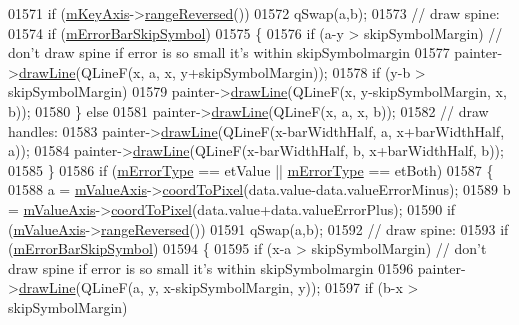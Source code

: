 \begin{DoxyCode}
01571       \textcolor{keywordflow}{if} (\hyperlink{a00024_a692421b963472fa6e16156a74ba96832}{mKeyAxis}->\hyperlink{a00025_ade26dc7994ccd8a11f64fd83377ee021}{rangeReversed}())
01572         qSwap(a,b);
01573       \textcolor{comment}{// draw spine:}
01574       \textcolor{keywordflow}{if} (\hyperlink{a00031_acf631d7dbd1055a69ab3b63094868557}{mErrorBarSkipSymbol})
01575       \{
01576         \textcolor{keywordflow}{if} (a-y > skipSymbolMargin) \textcolor{comment}{// don't draw spine if error is so small it's within skipSymbolmargin}
01577           painter->\hyperlink{a00047_a0b4b1b9bd495e182c731774dc800e6e0}{drawLine}(QLineF(x, a, x, y+skipSymbolMargin));
01578         \textcolor{keywordflow}{if} (y-b > skipSymbolMargin) 
01579           painter->\hyperlink{a00047_a0b4b1b9bd495e182c731774dc800e6e0}{drawLine}(QLineF(x, y-skipSymbolMargin, x, b));
01580       \} \textcolor{keywordflow}{else}
01581         painter->\hyperlink{a00047_a0b4b1b9bd495e182c731774dc800e6e0}{drawLine}(QLineF(x, a, x, b));
01582       \textcolor{comment}{// draw handles:}
01583       painter->\hyperlink{a00047_a0b4b1b9bd495e182c731774dc800e6e0}{drawLine}(QLineF(x-barWidthHalf, a, x+barWidthHalf, a));
01584       painter->\hyperlink{a00047_a0b4b1b9bd495e182c731774dc800e6e0}{drawLine}(QLineF(x-barWidthHalf, b, x+barWidthHalf, b));
01585     \}
01586     \textcolor{keywordflow}{if} (\hyperlink{a00031_a29e64273db201aeadebc61c870720a36}{mErrorType} == etValue || \hyperlink{a00031_a29e64273db201aeadebc61c870720a36}{mErrorType} == etBoth)
01587     \{
01588       a = \hyperlink{a00024_acfc46d619ab9598be33b64146da45822}{mValueAxis}->\hyperlink{a00025_a985ae693b842fb0422b4390fe36d299a}{coordToPixel}(data.value-data.valueErrorMinus);
01589       b = \hyperlink{a00024_acfc46d619ab9598be33b64146da45822}{mValueAxis}->\hyperlink{a00025_a985ae693b842fb0422b4390fe36d299a}{coordToPixel}(data.value+data.valueErrorPlus);
01590       \textcolor{keywordflow}{if} (\hyperlink{a00024_acfc46d619ab9598be33b64146da45822}{mValueAxis}->\hyperlink{a00025_ade26dc7994ccd8a11f64fd83377ee021}{rangeReversed}())
01591         qSwap(a,b);
01592       \textcolor{comment}{// draw spine:}
01593       \textcolor{keywordflow}{if} (\hyperlink{a00031_acf631d7dbd1055a69ab3b63094868557}{mErrorBarSkipSymbol})
01594       \{
01595         \textcolor{keywordflow}{if} (x-a > skipSymbolMargin) \textcolor{comment}{// don't draw spine if error is so small it's within skipSymbolmargin}
01596           painter->\hyperlink{a00047_a0b4b1b9bd495e182c731774dc800e6e0}{drawLine}(QLineF(a, y, x-skipSymbolMargin, y));
01597         \textcolor{keywordflow}{if} (b-x > skipSymbolMargin)

\end{DoxyCode}
